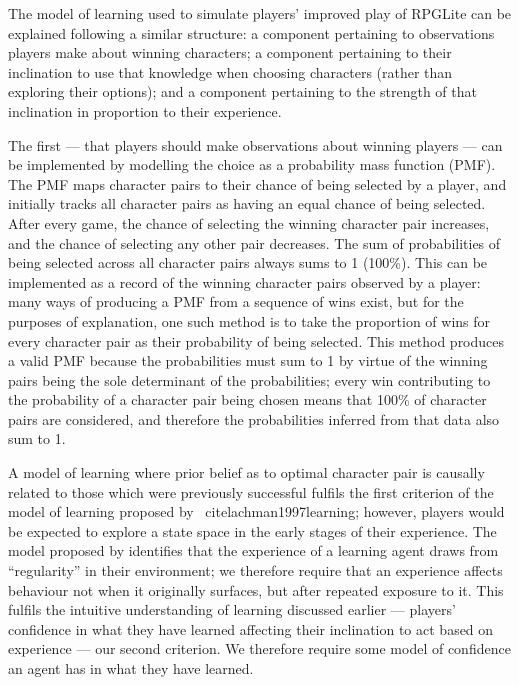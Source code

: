 The model of learning used to simulate players' improved play of RPGLite can be
explained following a similar structure: a component pertaining to observations
players make about winning characters; a component pertaining to their inclination
to use that knowledge when choosing characters (rather than exploring their options);
and a component pertaining to the strength of that inclination in proportion to their
experience.

The first --- that players should make observations about winning players --- can
be implemented by modelling the choice as a probability mass function (PMF). The PMF
maps character pairs to their chance of being selected by a player, and initially tracks
all character pairs as having an equal chance of being selected. After every game, the chance
of selecting the winning character pair increases, and the chance of selecting any other pair
decreases. The sum of probabilities of being selected across all character pairs always sums
to 1 (100\%). This can be implemented as a record of the winning character pairs observed by
a player: many ways of producing a PMF from a sequence of wins exist, but for the purposes of
explanation, one such method is to take the proportion of wins for every character pair as 
their probability of being selected. This method produces a valid PMF because the probabilities
must sum to 1 by virtue of the winning pairs being the sole determinant of the probabilities;
every win contributing to the probability of a character pair being chosen means that
100\% of character pairs are considered, and therefore the probabilities inferred from that data
also sum to 1.

A model of learning where prior belief as to optimal character pair is causally related to
those which were previously successful fulfils the first criterion of the model of learning proposed
by \citeauthor{lachman1997learning}~cite{lachman1997learning}; however, players would be expected to
explore a state space in the early stages of their experience. The model proposed by
\citeauthor{lachman1997learning} identifies that the experience of a learning agent draws from
``regularity'' in their environment; we therefore require that an experience affects behaviour
not when it originally surfaces, but after repeated exposure to it. This fulfils the intuitive
understanding of learning discussed earlier --- players' confidence in what they have learned affecting
their inclination to act based on experience --- our second criterion. We therefore require some model of
confidence an agent has in what they have learned.


